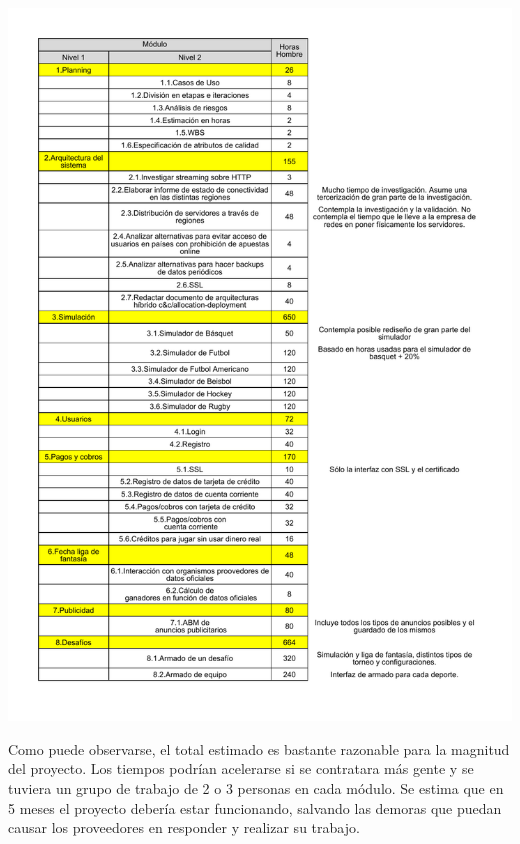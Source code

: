 \newpage
\includegraphics[width=\textwidth, page=2, clip, trim=20 200 20 30]{imagenes/estimacionModulos.pdf}

Como puede observarse, el total estimado es bastante razonable para la magnitud del proyecto. Los tiempos podrían acelerarse si se contratara más gente y se tuviera un grupo de trabajo de 2 o 3 personas en cada módulo. Se estima que en 5 meses el proyecto debería estar funcionando, salvando las demoras que puedan causar los proveedores en responder y realizar su trabajo.